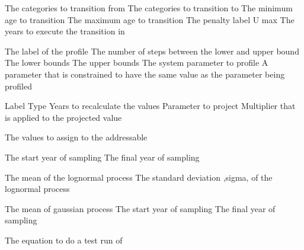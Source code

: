 \par\textbf{}\par
{} {The categories to transition from}
 {The categories to transition to}
 {The minimum age to transition}
 {The maximum age to transition}
 {The penalty label}
 {U max}
 {The years to execute the transition in}
\par\par
{} {The label of the profile}
 {The number of steps between the lower and upper bound}
 {The lower bounds}
 {The upper bounds}
 {The system parameter to profile}
 {A parameter that is constrained to have the same value as the parameter being profiled}
\par\par
{} {Label}
 {Type}
 {Years to recalculate the values}
 {Parameter to project}
 {Multiplier that is applied to the projected value}
\par\textbf{}\par
{} {The values to assign to the addressable}
\par\textbf{}\par
{} {The start year of sampling}
 {The final year of sampling}
\par\textbf{}\par
{} {The mean of the lognormal process}
 {The standard deviation ,sigma, of the lognormal process}
\par\textbf{}\par
{} {The mean of gaussian process}
 {The start year of sampling}
 {The final year of sampling}
\par\textbf{}\par
{} {The equation to do a test run of}
\par\par

